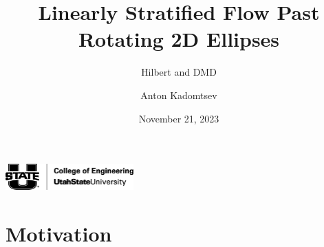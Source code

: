 \documentclass[aspectratio=169,xcolor=dvipsnames]{beamer}
\title[short title]{Linearly Stratified Flow Past Rotating 2D Ellipses}
\subtitle{Hilbert and DMD}
\author[Anton] {Anton Kadomtsev}
\institute[USU] %
{
    Department of Mechanical and Aerospace Engineering
    \vskip 3pt
}
\date{November 21, 2023} %
\begin{document}
\begin{frame}
    \titlepage
        \includegraphics[height=1.0cm]{figures/u-state-black.png}
\end{frame}


\section{Motivation}
\end{document}
